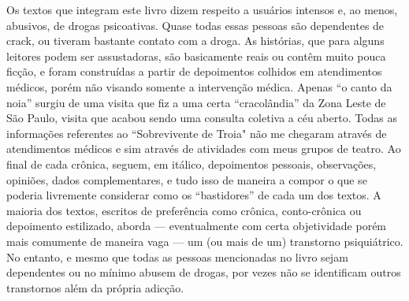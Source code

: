 Os textos que integram este livro dizem respeito a usuários intensos e, ao
menos, abusivos, de drogas psicoativas. Quase todas essas pessoas são
dependentes de crack, ou tiveram bastante contato com a droga.
As histórias, que para alguns leitores podem ser assustadoras,
são basicamente reais ou contêm muito pouca ficção, e foram construídas a
partir de depoimentos colhidos em atendimentos médicos, porém não visando
somente a intervenção médica.
Apenas ``o canto da noia'' surgiu de uma visita que fiz a uma
certa ``cracolândia'' da Zona Leste de São Paulo, visita que acabou sendo uma
consulta coletiva a céu aberto.
Todas as informações referentes ao ``Sobrevivente de Troia" 
não me chegaram através de atendimentos médicos e sim através de atividades com
meus grupos de teatro.
Ao final de cada crônica, seguem, em itálico, depoimentos pessoais,
observações, opiniões, dados complementares, e tudo isso de maneira a compor o
que se poderia livremente considerar como os “bastidores” de cada um dos
textos.
A maioria dos textos, escritos de preferência como crônica, conto-crônica ou
depoimento estilizado, aborda — eventualmente com certa objetividade porém mais
comumente de maneira vaga — um (ou mais de um) transtorno psiquiátrico.
No entanto, e mesmo que todas as pessoas mencionadas no livro sejam dependentes
ou no mínimo abusem de drogas, por vezes não se identificam outros transtornos
além da própria adicção.\par
